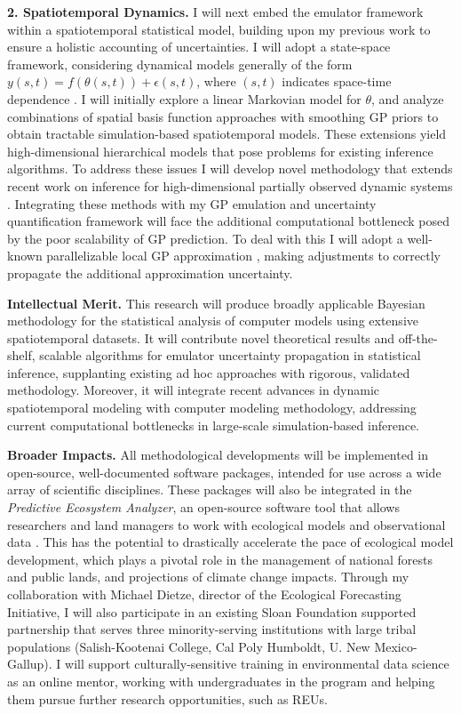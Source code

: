 \documentclass[11pt]{article}
\begin{document}
 \textbf{2. Spatiotemporal Dynamics.} I will next embed the emulator framework within a spatiotemporal statistical model, building upon my previous work to ensure a holistic accounting of uncertainties. I will adopt a state-space framework, considering dynamical models generally of the form $y(s, t) = f(\theta(s, t)) + \epsilon(s, t)$, where $(s, t)$ indicates space-time dependence \cite{Wikle, Hefley}. I will initially explore a linear Markovian model for $\theta$, and analyze combinations of spatial basis function approaches with smoothing GP priors to obtain tractable simulation-based spatiotemporal models. 
These extensions yield high-dimensional hierarchical models that pose problems for existing inference algorithms. To address these issues I will develop novel methodology that extends recent work on inference for high-dimensional partially observed dynamic systems \cite{Park}. Integrating these methods with my GP emulation and uncertainty quantification framework will face the additional computational bottleneck posed by the poor scalability of GP prediction. To deal with this I will adopt a well-known parallelizable local GP approximation \cite{Gramacy}, making adjustments to correctly propagate the additional approximation uncertainty. 

\noindent
\textbf{Intellectual Merit.} This research will produce broadly applicable Bayesian methodology for the statistical analysis of computer models using extensive spatiotemporal datasets. It will contribute novel theoretical results and off-the-shelf, scalable algorithms for emulator uncertainty propagation in statistical inference, supplanting existing ad hoc approaches with rigorous, validated methodology. Moreover, it will integrate recent advances in dynamic spatiotemporal modeling with computer modeling methodology, addressing current computational bottlenecks in large-scale simulation-based inference.

\noindent
\textbf{Broader Impacts.} All methodological developments will be implemented in open-source, well-documented software packages, intended for use across a wide array of scientific disciplines. These packages will also be integrated in the \textit{Predictive Ecosystem Analyzer}, an open-source software tool that allows researchers and land managers to work with ecological models and observational data \cite{Fer}. This has the potential to drastically accelerate the pace of ecological model development, which plays a pivotal role in the management of national forests and public lands, and projections of climate change impacts. Through my collaboration with Michael Dietze, director of the Ecological Forecasting Initiative, I will also participate in an existing Sloan Foundation supported partnership that serves three minority-serving institutions with large tribal populations (Salish-Kootenai College, Cal Poly Humboldt, U. New Mexico-Gallup). I will support culturally-sensitive training in environmental data science as an online mentor, working with undergraduates in the program and helping them pursue further research opportunities, such as REUs. 
\end{document}
